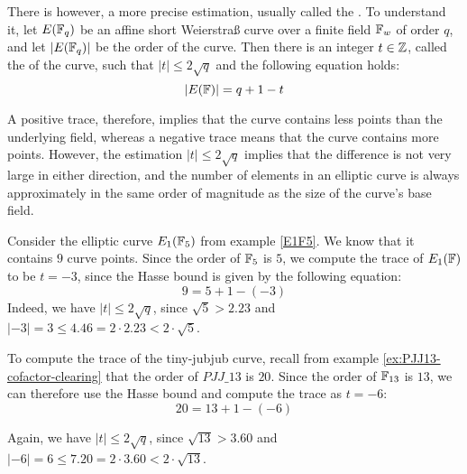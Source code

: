 There is however, a more precise estimation, usually called the . To understand it, let $E(\mathbb{F}_q)$ be an affine short Weierstraß curve over a finite field $\mathbb{F}_w$ of order $q$, and let $|E(\mathbb{F}_q)|$ be the order of the curve. Then there is an integer $t\in \mathbb{Z}$, called the  of the curve, such that $|t| \leq 2\sqrt{q}$ and the following equation holds:
\begin{equation}\label{hasse-bound}
|E(\mathbb{F})| = q +1 -t
\end{equation}

A positive trace, therefore, implies that the curve contains less points than the underlying field, whereas a negative trace means that the curve contains more points. However, the estimation $|t| \leq 2\sqrt{q}$ implies that the difference is not very large in either direction, and the number of elements in an elliptic curve is always approximately in the same order of magnitude as the size of the curve's base field.

\begin{example}\label{ex:E1F5-frobenius} Consider the elliptic curve $E_1(\mathbb{F}_5)$ from example \ref{E1F5}. We know that it contains $9$ curve points. Since the order of $\mathbb{F}_5$ is $5$, we compute the trace of $E_1(\mathbb{F})$ to be $t=-3$, since the Hasse bound is given by the following equation:
$$
9 = 5 + 1 - (-3)
$$
Indeed, we have $|t| \leq 2\sqrt{q}$, since $\sqrt{5}> 2.23$ and 
$|-3|= 3 \leq 4.46 = 2\cdot 2.23< 2\cdot \sqrt{5}$.
\end{example}

\begin{example}\label{ex:PJJ13-frobenius} To compute the trace of the tiny-jubjub curve, recall from example \ref{ex:PJJ13-cofactor-clearing} that the order of $\mathit{PJJ\_13}$ is $20$. Since the order of $\mathbb{F}_{13}$ is $13$, we can therefore use the Hasse bound and compute the trace as $t=-6$:
\begin{equation}
20 = 13 + 1 - (-6)
\end{equation}

Again, we have $|t| \leq 2\sqrt{q}$, since $\sqrt{13}> 3.60$ and 
$|-6|= 6 \leq 7.20 = 2\cdot 3.60< 2\cdot \sqrt{13}$.
\end{example}

